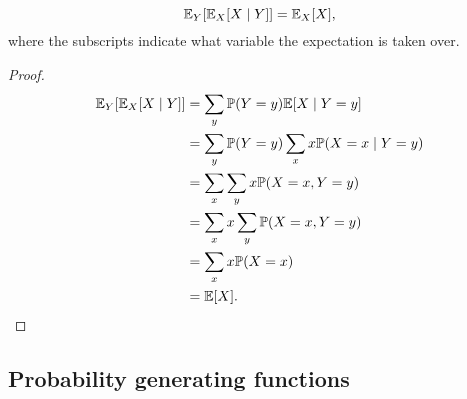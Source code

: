 %
\begin{note}
  \begin{field}
    \begin{thm}
      \[
        \mathbb{E}_Y[\mathbb{E}_X[X\mid Y]] = \mathbb{E}_X[X],
      \]
      where the subscripts indicate what variable the expectation is taken over.
    \end{thm}
  \end{field}
  \begin{field}
    \begin{proof}
      \begin{align*}
        \mathbb{E}_Y[\mathbb{E}_X[X\mid Y]] &= \sum_y \mathbb{P}(Y = y)\mathbb{E}[X\mid Y = y]\\
        &= \sum _y \mathbb{P}(Y = y) \sum_{x}x\mathbb{P}(X = x\mid Y = y)\\
        &= \sum_x\sum_y x\mathbb{P}(X = x, Y = y)\\
        &= \sum _x x\sum_y \mathbb{P}(X = x, Y = y)\\
        &= \sum_x x\mathbb{P}(X = x)\\
        &= \mathbb{E}[X].\qedhere
      \end{align*}
    \end{proof}
  \end{field}
  \xplain{}%
\end{note}

\subsection{Probability generating functions}

